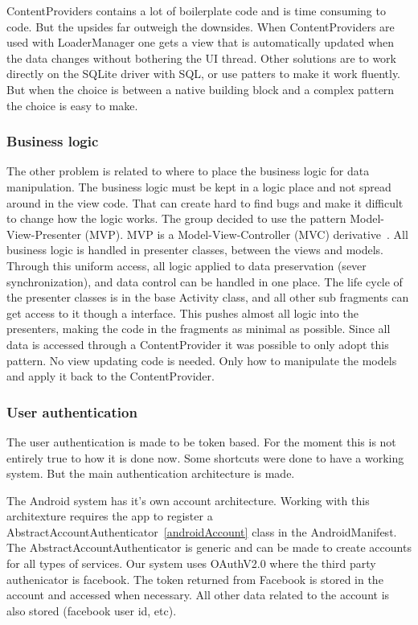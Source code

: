 ContentProviders contains a lot of boilerplate code and is time consuming to code. But the upsides far outweigh the downsides. When ContentProviders are used with LoaderManager one gets a view that is automatically updated when the data changes without bothering the UI thread. Other solutions are to work directly on the SQLite driver with SQL, or use patters to make it work fluently. But when the choice is between a native building block and a complex pattern the choice is easy to make. 

\subsubsection{Business logic}

The other problem is related to where to place the business logic for data manipulation. The business logic must be kept in a logic place and not spread around in the view code. That can create hard to find bugs and make it difficult to change how the logic works.
The group decided to use the pattern Model-View-Presenter (MVP). MVP is a Model-View-Controller (MVC) derivative~\cite{mvc}. All business logic is handled in presenter classes, between the views and models. Through this uniform access, all logic applied to data preservation (sever synchronization), and data control can be handled in one place. The life cycle of the presenter classes is in the base Activity class, and all other sub fragments can get access to it though a interface. 
This pushes almost all logic into the presenters, making the code in the fragments as minimal as possible. Since all data is accessed through a ContentProvider it was possible to only adopt this pattern. No view updating code is needed. Only how to manipulate the models and apply it back to the ContentProvider.


\subsubsection{User authentication}

The user authentication is made to be token based. For the moment this is not entirely true to how it is done now. Some shortcuts were done to have a working system. But the main authentication architecture is made.

The Android system has it's own account architecture. Working with this architexture requires the app to register a AbstractAccountAuthenticator~\ref{androidAccount} class in the AndroidManifest. The AbstractAccountAuthenticator is generic and can be made to create accounts for all types of services. Our system uses OAuthV2.0 where the third party authenicator is facebook. The token returned from Facebook is stored in the account and accessed when necessary. All other data related to the account is also stored (facebook user id, etc).

